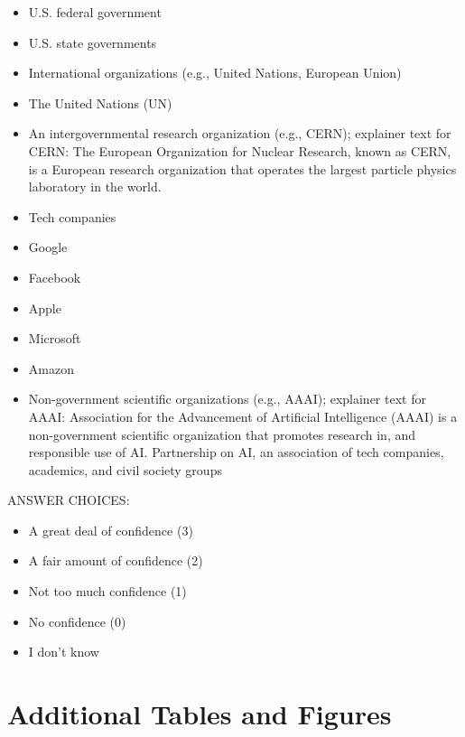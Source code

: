 \documentclass{article}
\begin{document}

\begin{itemize}
\item U.S. federal government
\item U.S. state governments
\item International organizations (e.g., United Nations, European Union)
\item The United Nations (UN)
\item An intergovernmental research organization (e.g., CERN); explainer text for CERN: The European Organization for Nuclear Research, known as CERN, is a European research organization that operates the largest particle physics laboratory in the world.
\item Tech companies
\item Google
\item Facebook
\item Apple
\item Microsoft
\item Amazon
\item Non-government scientific organizations (e.g., AAAI); explainer text for AAAI: Association for the Advancement of Artificial Intelligence (AAAI) is a non-government scientific organization that promotes research in, and responsible use of AI.
Partnership on AI, an association of tech companies, academics, and civil society groups
\end{itemize}

\noindent ANSWER CHOICES:

\begin{itemize}
\item A great deal of confidence (3)
\item A fair amount of confidence (2)
\item Not too much confidence (1)
\item No confidence (0)
\item I don’t know
\end{itemize}

\FloatBarrier

\section{Additional Tables and Figures}
\end{document}
